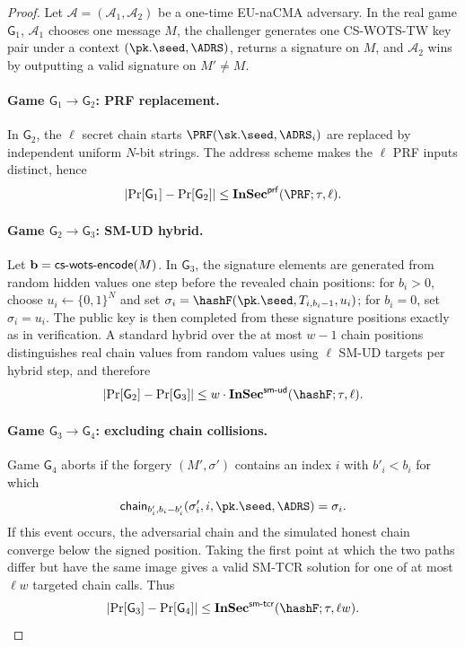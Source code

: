 \begin{proof}
Let $\mathcal{A}=(\mathcal{A}_1,\mathcal{A}_2)$ be a one-time EU-naCMA
adversary.  In the real game $\mathsf{G}_1$, $\mathcal{A}_1$ chooses one
message $M$, the challenger generates one CS-WOTS-TW key pair under a context
$(\pk.\seed,\ADRS)$, returns a signature on $M$, and $\mathcal{A}_2$ wins by
outputting a valid signature on $M'\ne M$.

\paragraph{Game $\mathsf{G}_1\to\mathsf{G}_2$: PRF replacement.}
In $\mathsf{G}_2$, the $\ell$ secret chain starts
$\PRF(\sk.\seed,\ADRS_i)$ are replaced by independent uniform $N$-bit strings.
The address scheme makes the $\ell$ PRF inputs distinct, hence
\[
    \left|\Pr[\mathsf{G}_1]-\Pr[\mathsf{G}_2]\right|
    \le \InSec{prf}(\PRF;\tau,\ell).
\]

\paragraph{Game $\mathsf{G}_2\to\mathsf{G}_3$: SM-UD hybrid.}
Let $\mathbf{b}=\mathsf{cs\text{-}wots\text{-}encode}(M)$.  In $\mathsf{G}_3$, the signature elements are
generated from random hidden values one step before the revealed chain
positions: for $b_i>0$, choose $u_i\leftarrow\{0,1\}^N$ and set
$\sigma_i=\hashF(\pk.\seed,T_{i,b_i-1},u_i)$; for $b_i=0$, set
$\sigma_i=u_i$.  The public key is then completed from these signature
positions exactly as in verification.  A standard hybrid over the at most
$w-1$ chain positions distinguishes real chain values from random values using
$\ell$ SM-UD targets per hybrid step, and therefore
\[
    \left|\Pr[\mathsf{G}_2]-\Pr[\mathsf{G}_3]\right|
    \le w\cdot\InSec{sm\text{-}ud}(\hashF;\tau,\ell).
\]

\paragraph{Game $\mathsf{G}_3\to\mathsf{G}_4$: excluding chain collisions.}
Game $\mathsf{G}_4$ aborts if the forgery $(M',\sigma')$ contains an index
$i$ with $b'_i<b_i$ for which
\[
    \Chain_{b'_i,b_i-b'_i}(\sigma'_i,i,\pk.\seed,\ADRS)=\sigma_i.
\]
If this event occurs, the adversarial chain and the simulated honest chain
converge below the signed position.  Taking the first point at which the two
paths differ but have the same image gives a valid SM-TCR solution for one of
at most $\ell w$ targeted chain calls.  Thus
\[
    \left|\Pr[\mathsf{G}_3]-\Pr[\mathsf{G}_4]\right|
    \le \InSec{sm\text{-}tcr}(\hashF;\tau,\ell w).
\]


\end{proof}

